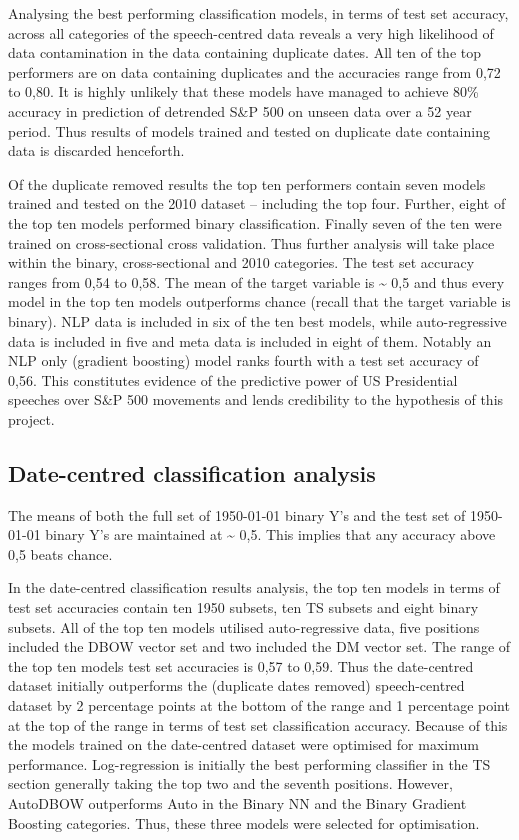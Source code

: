 \documentclass[11pt,preprint, authoryear]{elsarticle}
\numberwithin{equation}{section}
\numberwithin{figure}{section}
\numberwithin{table}{section}
\begin{document}
Analysing the best performing classification models, in terms of test
set accuracy, across all categories of the speech-centred data reveals a
very high likelihood of data contamination in the data containing
duplicate dates. All ten of the top performers are on data containing
duplicates and the accuracies range from 0,72 to 0,80. It is highly
unlikely that these models have managed to achieve 80\% accuracy in
prediction of detrended S\&P 500 on unseen data over a 52 year period.
Thus results of models trained and tested on duplicate date containing
data is discarded henceforth.

Of the duplicate removed results the top ten performers contain seven
models trained and tested on the 2010 dataset -- including the top four.
Further, eight of the top ten models performed binary classification.
Finally seven of the ten were trained on cross-sectional cross
validation. Thus further analysis will take place within the binary,
cross-sectional and 2010 categories. The test set accuracy ranges from
0,54 to 0,58. The mean of the target variable is \textasciitilde{} 0,5
and thus every model in the top ten models outperforms chance (recall
that the target variable is binary). NLP data is included in six of the
ten best models, while auto-regressive data is included in five and meta
data is included in eight of them. Notably an NLP only (gradient
boosting) model ranks fourth with a test set accuracy of 0,56. This
constitutes evidence of the predictive power of US Presidential speeches
over S\&P 500 movements and lends credibility to the hypothesis of this
project.

\hypertarget{date-centred-classification-analysis}{%
\subsection{Date-centred classification
analysis}\label{date-centred-classification-analysis}}

The means of both the full set of 1950-01-01 binary Y's and the test set
of 1950-01-01 binary Y's are maintained at \textasciitilde{} 0,5. This
implies that any accuracy above 0,5 beats chance.

In the date-centred classification results analysis, the top ten models
in terms of test set accuracies contain ten 1950 subsets, ten TS subsets
and eight binary subsets. All of the top ten models utilised
auto-regressive data, five positions included the DBOW vector set and
two included the DM vector set. The range of the top ten models test set
accuracies is 0,57 to 0,59. Thus the date-centred dataset initially
outperforms the (duplicate dates removed) speech-centred dataset by 2
percentage points at the bottom of the range and 1 percentage point at
the top of the range in terms of test set classification accuracy.
Because of this the models trained on the date-centred dataset were
optimised for maximum performance. Log-regression is initially the best
performing classifier in the TS section generally taking the top two and
the seventh positions. However, AutoDBOW outperforms Auto in the Binary
NN and the Binary Gradient Boosting categories. Thus, these three models
were selected for optimisation.
\end{document}

